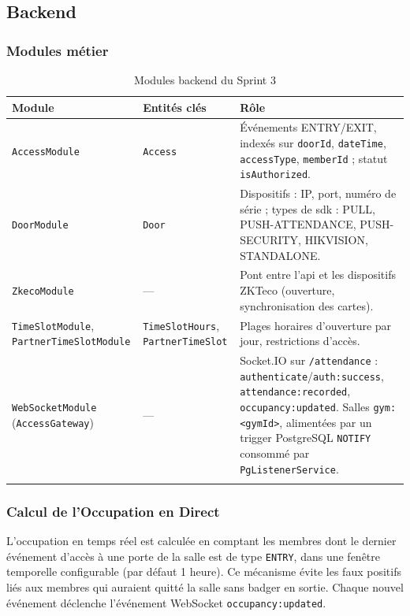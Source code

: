 ﻿\documentclass[../main.tex]{subfiles}
\begin{document}
\subsection{Backend}

\subsubsection{Modules m\'{e}tier}

\begin{longtable}{|>{\footnotesize}p{4.5cm}|>{\footnotesize}p{3.6cm}|p{5.6cm}|}
\hline
\textbf{Module} & \textbf{Entit\'{e}s cl\'{e}s} & \textbf{R\^{o}le} \\
\hline
\endfirsthead
\hline
\endfoot
\texttt{AccessModule} & \texttt{Access} & \'{E}v\'{e}nements ENTRY/EXIT, index\'{e}s sur \texttt{doorId}, \texttt{dateTime}, \texttt{accessType}, \texttt{memberId} ; statut \texttt{isAuthorized}. \\
\hline
\texttt{DoorModule} & \texttt{Door} & Dispositifs : IP, port, num\'{e}ro de s\'{e}rie ; types de \acrshort{sdk} : PULL, PUSH-ATTENDANCE, PUSH-SECURITY, HIKVISION, STANDALONE. \\
\hline
\texttt{ZkecoModule} & --- & Pont entre l'\acrshort{api} et les dispositifs ZKTeco (ouverture, synchronisation des cartes). \\
\hline
\texttt{TimeSlotModule}, \texttt{PartnerTimeSlotModule} & \texttt{TimeSlotHours}, \texttt{PartnerTimeSlot} & Plages horaires d'ouverture par jour, restrictions d'acc\`{e}s. \\
\hline
\texttt{WebSocketModule} (\texttt{AccessGateway}) & --- & Socket.IO sur \texttt{/attendance} : \texttt{authenticate}/\texttt{auth:success}, \texttt{attendance:recorded}, \texttt{occupancy:updated}. Salles \texttt{gym:<gymId>}, aliment\'{e}es par un trigger PostgreSQL \texttt{NOTIFY} consomm\'{e} par \texttt{PgListenerService}. \\
\hline
\caption{Modules backend du Sprint 3}
\end{longtable}

\subsubsection{Calcul de l'Occupation en Direct}

L'occupation en temps r\'{e}el est calcul\'{e}e en comptant les membres dont le dernier \'{e}v\'{e}nement d'acc\`{e}s \`{a} une porte de la salle est de type \texttt{ENTRY}, dans une fen\^{e}tre temporelle configurable (par d\'{e}faut 1 heure). Ce m\'{e}canisme \'{e}vite les faux positifs li\'{e}s aux membres qui auraient quitt\'{e} la salle sans badger en sortie. Chaque nouvel \'{e}v\'{e}nement d\'{e}clenche l'\'{e}v\'{e}nement WebSocket \texttt{occupancy:updated}.
\end{document}
